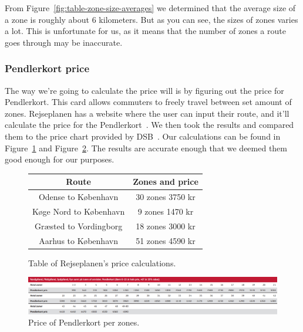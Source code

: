 From Figure~\ref{fig:table-zone-size-averages} we determined that the average size of a zone is roughly about 6
kilometers.
But as you can see, the sizes of zones varies a lot.
This is unfortunate for us, as it means that the number of zones a route goes through may be inaccurate.

\subsubsection{Pendlerkort price}

The way we're going to calculate the price will is by figuring out the price for Pendlerkort.
This card allows commuters to freely travel between set amount of zones.
Rejseplanen has a website where the user can input their route, and it'll calculate the price for the
Pendlerkort~\cite{price_calculator}.
We then took the results and compared them to the price chart provided by DSB~\cite{price_sheet}.
Our calculations can be found in Figure~\ref{fig:table-rejseplanen-price-calculations} and
Figure~\ref{fig:image-dsb-pendlerkort-pris}.
The results are accurate enough that we deemed them good enough for our purposes.

\begin{figure}[H]
    \centering
    \noindent
    \begin{tabular}{ || c | c || }
        \hline
        Route & Zones and price \\
        \hline\hline
        Odense to København & 30 zones 3750 kr \\
        \hline
        Køge Nord to København & 9 zones 1470 kr \\
        \hline
        Græsted to Vordingborg & 18 zones 3000 kr \\
        \hline
        Aarhus to København & 51 zones 4590 kr \\
        \hline
    \end{tabular}
    \caption{Table of Rejseplanen's price calculations.}
    \label{fig:table-rejseplanen-price-calculations}
\end{figure}

\begin{figure}[H]
    \centering
    \includegraphics[width=1\textwidth]{images/dsb-pendlerkort-pris.jpg}
    \caption{Price of Pendlerkort per zones.}
    \label{fig:image-dsb-pendlerkort-pris}
\end{figure}

